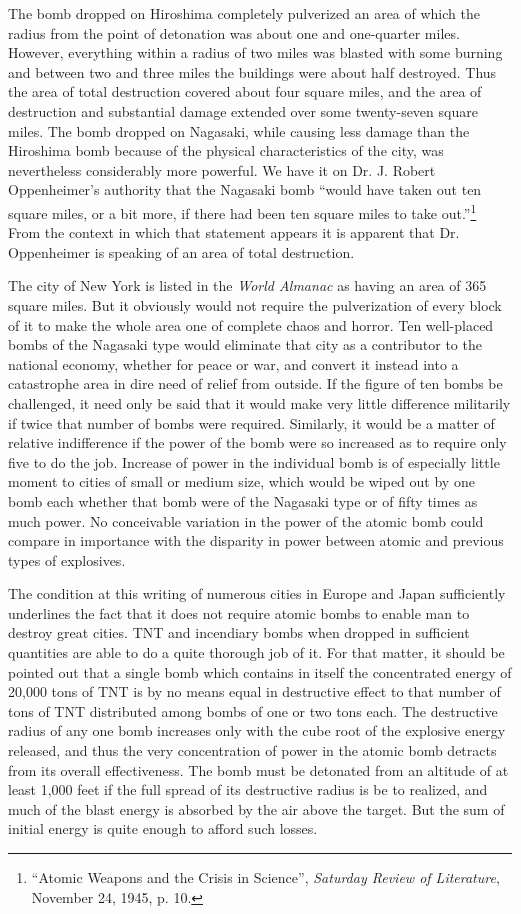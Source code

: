 The bomb dropped on Hiroshima completely pulverized an area of which the radius from the point of detonation was about one and one-quarter miles. However, everything within a radius of two miles was blasted with some burning and between two and three miles the buildings were about half destroyed. Thus the area of total destruction covered about four square miles, and the area of destruction and substantial damage extended over some twenty-seven square miles. The bomb dropped on Nagasaki, while causing less damage than the Hiroshima bomb because of the physical characteristics of the city, was nevertheless considerably more powerful. We have it on Dr. J. Robert Oppenheimer's authority that the Nagasaki bomb ``would have taken out ten square miles, or a bit more, if there had been ten square miles to take out.''\footnote{``Atomic Weapons and the Crisis in Science'', \textit{Saturday Review of Literature}, November 24, 1945, p. 10.} From the context in which that statement appears it is apparent that Dr. Oppenheimer is speaking of an area of total destruction.

The city of New York is listed in the \emph{World Almanac} as having an area of 365 square miles. But it obviously would not require the pulverization of every block of it to make the whole area one of complete chaos and horror. Ten well-placed bombs of the Nagasaki type would eliminate that city as a contributor to the national economy, whether for peace or war, and convert it instead into a catastrophe area in dire need of relief from outside. If the figure of ten bombs be challenged, it need only be said that it would make very little difference militarily if twice that number of bombs were required. Similarly, it would be a matter of relative indifference if the power of the bomb were so increased as to require only five to do the job. Increase of power in the individual bomb is of especially little moment to cities of small or medium size, which would be wiped out by one bomb each whether that bomb were of the Nagasaki type or of fifty times as much power. No conceivable variation in the power of the atomic bomb could compare in importance with the disparity in power between atomic and previous types of explosives.

The condition at this writing of numerous cities in Europe and Japan sufficiently underlines the fact that it does not require atomic bombs to enable man to destroy great cities. TNT and incendiary bombs when dropped in sufficient quantities are able to do a quite thorough job of it. For that matter, it should be pointed out that a single bomb which contains in itself the concentrated energy of 20,000 tons of TNT is by no means equal in destructive effect to that number of tons of TNT distributed among bombs of one or two tons each. The destructive radius of any one bomb increases only with the cube root of the explosive energy released, and thus the very concentration of power in the atomic bomb detracts from its overall effectiveness. The bomb must be detonated from an altitude of at least 1,000 feet if the full spread of its destructive radius is be to realized, and much of the blast energy is absorbed by the air above the target. But the sum of initial energy is quite enough to afford such losses.


